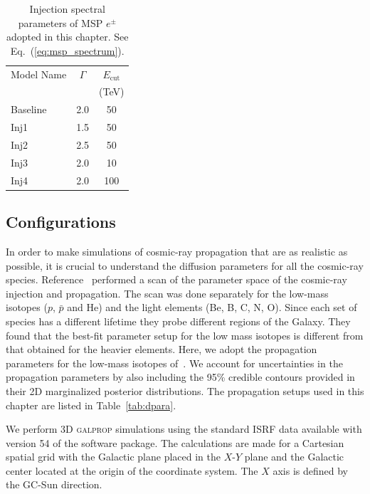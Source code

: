 \documentclass[doublespace,nopageskip]{VTthesis}
\begin{document}
\begin{table}[htb]
  \centering
  \caption{Injection spectral parameters of MSP $e^{\pm}$ adopted in this chapter. See Eq.~(\ref{eq:msp_spectrum}).}
    \begin{tabular}{lcc}
    \toprule
    Model Name&$\Gamma$ & $E_{\text{cut}}$\\
    & &  (TeV) \\
    \midrule
    Baseline &2.0 & 50 \\
    Inj1&1.5 & 50 \\
    Inj2&2.5 & 50 \\
    Inj3&2.0 & 10 \\
    Inj4&2.0 & 100\\
    \bottomrule
    \end{tabular}
  \label{tab:msp_spectrum}
\end{table}

\subsection{Configurations}

In order to make simulations of cosmic-ray propagation that are as realistic as possible, it is crucial to understand the diffusion parameters for all the cosmic-ray species. Reference~\cite{2016ApJ...824...16J} performed a scan of the parameter space of the cosmic-ray injection and propagation. The scan was done separately for the low-mass isotopes ($p$, $\bar{p}$ and He) and the light elements (Be, B, C, N, O). Since each set of species has a different lifetime they probe different regions of the Galaxy. They found that the best-fit parameter setup for the low mass isotopes is different from that obtained for the heavier elements. Here, we adopt the propagation parameters for the low-mass isotopes of~\citet{2016ApJ...824...16J}. We account for uncertainties in the propagation parameters by also including the 95\% credible contours provided in their 2D marginalized posterior distributions. The propagation setups used in this chapter are listed in Table~\ref{tab:dpara}.

We perform 3D \textsc{galprop} simulations using the standard ISRF data available with version 54 of the software package. The calculations are made for a Cartesian spatial grid with the Galactic plane placed in the $X$-$Y$ plane and the Galactic center located at the origin of the coordinate system. The $X$ axis is defined by the GC-Sun direction.
\end{document}
